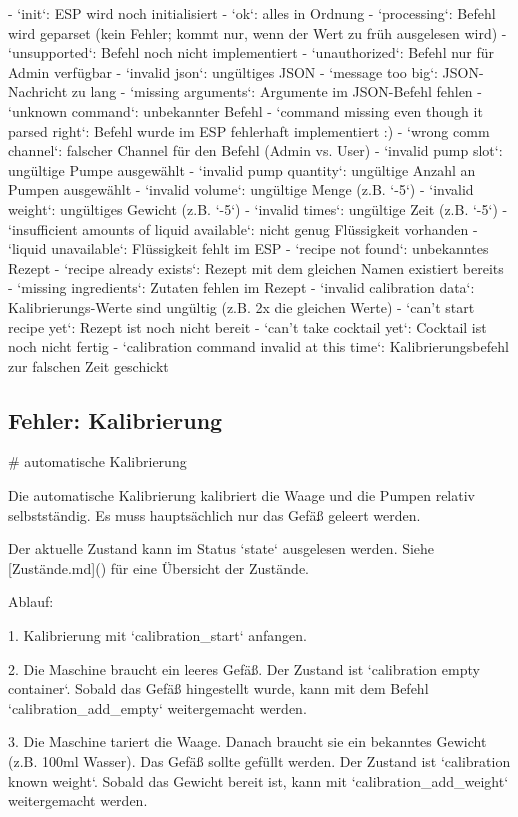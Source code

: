 - `init`: ESP wird noch initialisiert
- `ok`: alles in Ordnung
- `processing`: Befehl wird geparset (kein Fehler; kommt nur, wenn der Wert zu früh ausgelesen wird)
- `unsupported`: Befehl noch nicht implementiert
- `unauthorized`: Befehl nur für Admin verfügbar
- `invalid json`: ungültiges JSON
- `message too big`: JSON-Nachricht zu lang
- `missing arguments`: Argumente im JSON-Befehl fehlen
- `unknown command`: unbekannter Befehl
- `command missing even though it parsed right`: Befehl wurde im ESP fehlerhaft implementiert :)
- `wrong comm channel`: falscher Channel für den Befehl (Admin vs. User)
- `invalid pump slot`: ungültige Pumpe ausgewählt
- `invalid pump quantity`: ungültige Anzahl an Pumpen ausgewählt
- `invalid volume`: ungültige Menge (z.B. `-5`)
- `invalid weight`: ungültiges Gewicht (z.B. `-5`)
- `invalid times`: ungültige Zeit (z.B. `-5`)
- `insufficient amounts of liquid available`: nicht genug Flüssigkeit vorhanden
- `liquid unavailable`: Flüssigkeit fehlt im ESP
- `recipe not found`: unbekanntes Rezept
- `recipe already exists`: Rezept mit dem gleichen Namen existiert bereits
- `missing ingredients`: Zutaten fehlen im Rezept
- `invalid calibration data`: Kalibrierungs-Werte sind ungültig (z.B. 2x die gleichen Werte)
- `can't start recipe yet`: Rezept ist noch nicht bereit
- `can't take cocktail yet`: Cocktail ist noch nicht fertig
- `calibration command invalid at this time`: Kalibrierungsbefehl zur falschen Zeit geschickt

\subsection{Fehler: Kalibrierung}
# automatische Kalibrierung

Die automatische Kalibrierung kalibriert die Waage und die Pumpen relativ selbstständig. Es muss hauptsächlich nur das Gefäß geleert werden.

Der aktuelle Zustand kann im Status `state` ausgelesen werden. Siehe [Zustände.md]() für eine Übersicht der Zustände.

Ablauf:

1. Kalibrierung mit `calibration_start` anfangen.

2. Die Maschine braucht ein leeres Gefäß. Der Zustand ist `calibration empty container`. Sobald das Gefäß hingestellt wurde, kann mit dem Befehl `calibration_add_empty` weitergemacht werden.

3. Die Maschine tariert die Waage. Danach braucht sie ein bekanntes Gewicht (z.B. 100ml Wasser). Das Gefäß sollte gefüllt werden. Der Zustand ist `calibration known weight`. Sobald das Gewicht bereit ist, kann mit `calibration_add_weight` weitergemacht werden.

